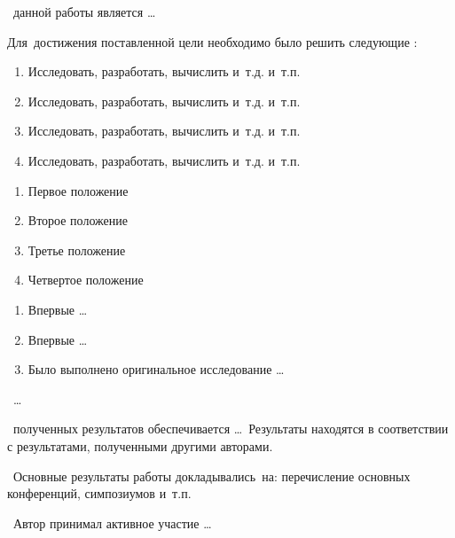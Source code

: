  \aim\ данной работы является \ldots

Для~достижения поставленной цели необходимо было решить следующие {\tasks}:
\begin{enumerate}
  \item Исследовать, разработать, вычислить и~т.\:д. и~т.\:п.
  \item Исследовать, разработать, вычислить и~т.\:д. и~т.\:п.
  \item Исследовать, разработать, вычислить и~т.\:д. и~т.\:п.
  \item Исследовать, разработать, вычислить и~т.\:д. и~т.\:п.
\end{enumerate}

\begin{enumerate}
  \item Первое положение
  \item Второе положение
  \item Третье положение
  \item Четвертое положение
\end{enumerate}

\novelty
\begin{enumerate}
  \item Впервые \ldots
  \item Впервые \ldots
  \item Было выполнено оригинальное исследование \ldots
\end{enumerate}

\influence\ \ldots

\reliability\ полученных результатов обеспечивается \ldots \ Результаты находятся в соответствии с результатами, полученными другими авторами.

\probation\
Основные результаты работы докладывались~на:
перечисление основных конференций, симпозиумов и~т.\:п.

\contribution\ Автор принимал активное участие \ldots


